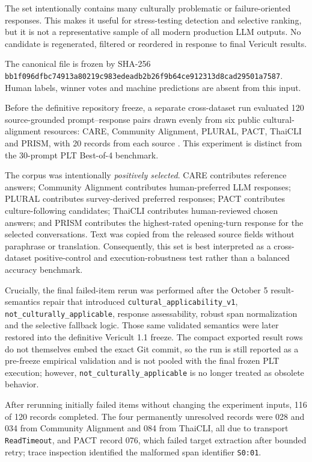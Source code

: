 The set intentionally contains many culturally problematic or failure-oriented responses. This makes it useful for stress-testing detection and selective ranking, but it is not a representative sample of all modern production LLM outputs. No candidate is regenerated, filtered or reordered in response to final Vericult results.

The canonical file is frozen by SHA-256
\texttt{bb1f096dfbc74913a80219c983edeadb2b26f9b64ce912313d8cad29501a7587}.
Human labels, winner votes and machine predictions are absent from this input.

\label{sec:external120-pre-freeze}

Before the definitive repository freeze, a separate cross-dataset run evaluated 120 source-grounded prompt--response pairs drawn evenly from six public cultural-alignment resources: CARE, Community Alignment, PLURAL, PACT, ThaiCLI and PRISM, with 20 records from each source \parencite{guo2025care,zhang2026cultivating,agarwal2026plural,borah2026pact,kim2025thaicli,kirk2024prism}. This experiment is distinct from the 30-prompt PLT Best-of-4 benchmark.

The corpus was intentionally \emph{positively selected}. CARE contributes reference answers; Community Alignment contributes human-preferred LLM responses; PLURAL contributes survey-derived preferred responses; PACT contributes culture-following candidates; ThaiCLI contributes human-reviewed chosen answers; and PRISM contributes the highest-rated opening-turn response for the selected conversations. Text was copied from the released source fields without paraphrase or translation. Consequently, this set is best interpreted as a cross-dataset positive-control and execution-robustness test rather than a balanced accuracy benchmark.

Crucially, the final failed-item rerun was performed after the October 5 result-semantics repair that introduced \texttt{cultural\_applicability\_v1}, \texttt{not\_culturally\_applicable}, response assessability, robust span normalization and the selective fallback logic. Those same validated semantics were later restored into the definitive Vericult 1.1 freeze. The compact exported result rows do not themselves embed the exact Git commit, so the run is still reported as a pre-freeze empirical validation and is not pooled with the final frozen PLT execution; however, \texttt{not\_culturally\_applicable} is no longer treated as obsolete behavior.

After rerunning initially failed items without changing the experiment inputs, 116 of 120 records completed. The four permanently unresolved records were 028 and 034 from Community Alignment and 084 from ThaiCLI, all due to transport \texttt{ReadTimeout}, and PACT record 076, which failed target extraction after bounded retry; trace inspection identified the malformed span identifier \texttt{S0:01}.

